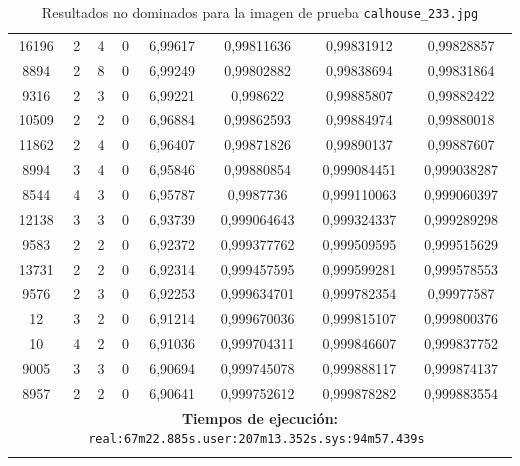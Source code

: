 \begin{longtable}{|c|c|c|c|c|c|c|c|}
16196 & 2 & 4 & 0 & 6,99617 & 0,99811636 & 0,99831912 & 0,99828857 \\
8894 & 2 & 8 & 0 & 6,99249 & 0,99802882 & 0,99838694 & 0,99831864 \\
9316 & 2 & 3 & 0 & 6,99221 & 0,998622 & 0,99885807 & 0,99882422 \\
10509 & 2 & 2 & 0 & 6,96884 & 0,99862593 & 0,99884974 & 0,99880018 \\
11862 & 2 & 4 & 0 & 6,96407 & 0,99871826 & 0,99890137 & 0,99887607 \\
8994 & 3 & 4 & 0 & 6,95846 & 0,99880854 & 0,999084451 & 0,999038287 \\
8544 & 4 & 3 & 0 & 6,95787 & 0,9987736 & 0,999110063 & 0,999060397 \\
12138 & 3 & 3 & 0 & 6,93739 & 0,999064643 & 0,999324337 & 0,999289298 \\
9583 & 2 & 2 & 0 & 6,92372 & 0,999377762 & 0,999509595 & 0,999515629 \\
13731 & 2 & 2 & 0 & 6,92314 & 0,999457595 & 0,999599281 & 0,999578553 \\
9576 & 2 & 3 & 0 & 6,92253 & 0,999634701 & 0,999782354 & 0,99977587 \\
12 & 3 & 2 & 0 & 6,91214 & 0,999670036 & 0,999815107 & 0,999800376 \\
10 & 4 & 2 & 0 & 6,91036 & 0,999704311 & 0,999846607 & 0,999837752 \\
9005 & 3 & 3 & 0 & 6,90694 & 0,999745078 & 0,999888117 & 0,999874137 \\
8957 & 2 & 2 & 0 & 6,90641 & 0,999752612 & 0,999878282 & 0,999883554 \\

\hline
\multicolumn{8}{|c|}{\textbf{Tiempos de ejecución:} \texttt{real:67m22.885s.user:207m13.352s.sys:94m57.439s
}}\\ \hline
\caption{Resultados no dominados para la imagen de prueba \texttt{calhouse\_233.jpg}}
\label{tab:calhouse_233}
\end{longtable}
\normalsize

